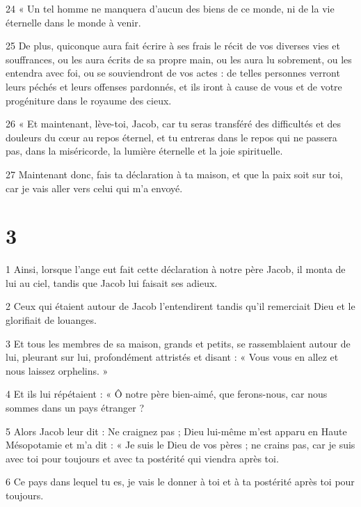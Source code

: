 \par 24 « Un tel homme ne manquera d'aucun des biens de ce monde, ni de la vie éternelle dans le monde à venir.

\par 25 De plus, quiconque aura fait écrire à ses frais le récit de vos diverses vies et souffrances, ou les aura écrits de sa propre main, ou les aura lu sobrement, ou les entendra avec foi, ou se souviendront de vos actes : de telles personnes verront leurs péchés et leurs offenses pardonnés, et ils iront à cause de vous et de votre progéniture dans le royaume des cieux.

\par 26 « Et maintenant, lève-toi, Jacob, car tu seras transféré des difficultés et des douleurs du cœur au repos éternel, et tu entreras dans le repos qui ne passera pas, dans la miséricorde, la lumière éternelle et la joie spirituelle.

\par 27 Maintenant donc, fais ta déclaration à ta maison, et que la paix soit sur toi, car je vais aller vers celui qui m'a envoyé.

\chapter{3}

\par 1 Ainsi, lorsque l'ange eut fait cette déclaration à notre père Jacob, il monta de lui au ciel, tandis que Jacob lui faisait ses adieux.

\par 2 Ceux qui étaient autour de Jacob l'entendirent tandis qu'il remerciait Dieu et le glorifiait de louanges.

\par 3 Et tous les membres de sa maison, grands et petits, se rassemblaient autour de lui, pleurant sur lui, profondément attristés et disant : « Vous vous en allez et nous laissez orphelins. »

\par 4 Et ils lui répétaient : « Ô notre père bien-aimé, que ferons-nous, car nous sommes dans un pays étranger ?

\par 5 Alors Jacob leur dit : Ne craignez pas ; Dieu lui-même m'est apparu en Haute Mésopotamie et m'a dit : « Je suis le Dieu de vos pères ; ne crains pas, car je suis avec toi pour toujours et avec ta postérité qui viendra après toi.

\par 6 Ce pays dans lequel tu es, je vais le donner à toi et à ta postérité après toi pour toujours.

